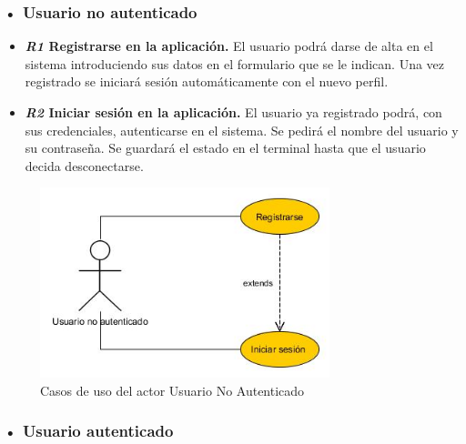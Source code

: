 \subsubsection{• Usuario no autenticado}
\begin{itemize}
\item\textbf{ \textit{R1}  Registrarse en la aplicación.}
 El usuario podrá darse de alta en el sistema
introduciendo sus datos en el formulario que se le indican. Una vez registrado se iniciará sesión
automáticamente con el nuevo perfil.

\item \textbf{\textit{R2} Iniciar sesión en la aplicación. }
El usuario ya registrado podrá, con
sus credenciales, autenticarse en el  sistema. Se pedirá el nombre del usuario y su contraseña. Se guardará el estado en el terminal hasta que el usuario decida desconectarse.
\end{itemize} 
\begin{figure}[H]
		\centering
		\includegraphics[width=0.75\textwidth] {usuario-no-autenticado.jpg}
		\caption{Casos de uso del actor Usuario No Autenticado }\label{fig:usuario-no-autenticado}
	\end{figure}
	
	
	
\subsubsection{• Usuario  autenticado}

